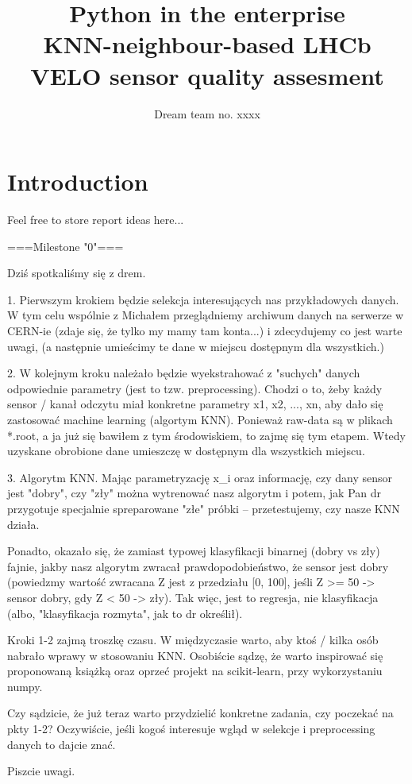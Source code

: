 \documentclass[a4paper,10pt]{article}
\title{\textbf{Python in the enterprise} \\ KNN-neighbour-based LHCb VELO sensor quality assesment}
\author{Dream team no. xxxx}
\begin{document}
\maketitle

\section{Introduction}
Feel free to store report ideas here...
\newline

===Milestone "0"===

Dziś spotkaliśmy się z drem.


1. Pierwszym krokiem będzie selekcja interesujących nas przykładowych danych. W tym celu wspólnie z Michałem przeglądniemy archiwum danych na serwerze w CERN-ie (zdaje się, że tylko my mamy tam konta...) i zdecydujemy co jest warte uwagi, (a następnie umieścimy te dane w miejscu dostępnym dla wszystkich.)

2. W kolejnym kroku należało będzie wyekstrahować z "suchych" danych odpowiednie parametry (jest to tzw. preprocessing). 
Chodzi o to, żeby każdy sensor / kanał odczytu miał konkretne parametry {x1, x2, ..., xn}, aby dało się zastosować machine learning (algortym KNN). Ponieważ raw-data są w plikach *.root, a ja już się bawiłem z tym środowiskiem, to zajmę się tym etapem. Wtedy uzyskane obrobione dane umieszczę w dostępnym dla wszystkich miejscu.

3. Algorytm KNN. Mając parametryzację {x_i} oraz informację, czy dany sensor jest "dobry", czy "zły" można wytrenować nasz algorytm i potem, jak Pan dr przygotuje specjalnie spreparowane "złe" próbki -- przetestujemy, czy nasze KNN działa.

Ponadto, okazało się, że zamiast typowej klasyfikacji binarnej (dobry vs zły) fajnie, jakby nasz algorytm zwracał prawdopodobieństwo, że sensor jest dobry (powiedzmy wartość zwracana Z jest z przedziału [0, 100], jeśli  Z >= 50 -> sensor dobry, gdy Z < 50 -> zły).
Tak więc, jest to regresja, nie klasyfikacja (albo, "klasyfikacja rozmyta", jak to dr określił).


Kroki 1-2 zajmą troszkę czasu. W międzyczasie warto, aby ktoś / kilka osób nabrało wprawy w stosowaniu KNN.
Osobiście sądzę, że warto inspirować się proponowaną książką oraz oprzeć projekt na scikit-learn, przy wykorzystaniu numpy.

Czy sądzicie, że już teraz warto przydzielić konkretne zadania, czy poczekać na pkty 1-2?
Oczywiście, jeśli kogoś interesuje wgląd w selekcje i preprocessing danych to dajcie znać.

Piszcie uwagi.
\end{document}
